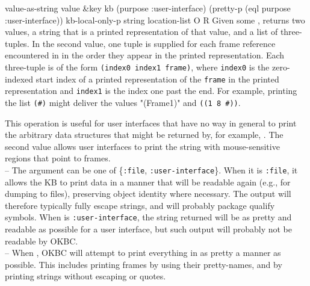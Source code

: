 \begin{okbcop}{value-as-string}{ value \&key kb (purpose :user-interface) (pretty-p (eql purpose :user-interface)) kb-local-only-p} { string location-list } { O } { R } {  }
Given some , returns two values, a string that is a printed
   representation of that value, and a list of three-tuples.
   In the second  value, one tuple is supplied for each
   frame reference encountered in  in the order they appear
   in the printed representation.  Each three-tuple is of the form
   {\tt (index0 index1 frame)}, where {\tt index0} is the zero-indexed
   start index of a printed representation of the
   {\tt frame} in the printed representation and {\tt index1} is the
   index one past the end.  For example, printing the list {\tt (\#<frame1>)}
   might deliver the values "(Frame1)" and {\tt ((1 8 \#<frame1>))}.

   This operation is useful for user interfaces that have no way in
   general to print the arbitrary data structures that might be returned by,
   for example, .  The second value allows user
   interfaces to print the string with mouse-sensitive regions that point to
   frames.\\
          -- The  argument can be one of \{{\tt :file},
             {\tt :user-interface}\}.  When it is {\tt :file}, it allows the
             KB to print data in a manner that will be readable again (e.g.,
             for dumping to files),
             preserving object identity where necessary.  The output will
             therefore typically fully escape strings, and will probably
             package qualify symbols.  When  is
             {\tt :user-interface}, the string returned will be as pretty
             and readable as possible for a user interface, but such
             output will probably not be readable by OKBC.\\
           -- When \true, OKBC will attempt to print everything in as pretty a
              manner as possible.  This includes printing frames by using their
              pretty-names, and by printing strings without escaping or
              quotes.
\end{okbcop}